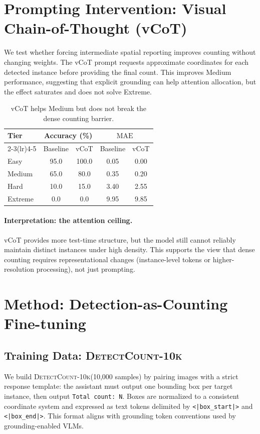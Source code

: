 \documentclass[10pt]{article}
\newcommand{\trainset}{\textsc{DetectCount-10k}\xspace}   %
\newcommand{\mae}{\ensuremath{\mathrm{MAE}}\xspace}
\newcommand{\boxstart}{\texttt{<|box\_start|>}\xspace}
\newcommand{\boxend}{\texttt{<|box\_end|>}\xspace}
\begin{document}
\section{Prompting Intervention: Visual Chain-of-Thought (vCoT)}
We test whether forcing intermediate spatial reporting improves counting without changing weights.
The vCoT prompt requests approximate coordinates for each detected instance before providing the final count.
This improves Medium performance, suggesting that explicit grounding can help attention allocation, but the effect saturates and does not solve Extreme.

\begin{table}[t]
  \centering
  \small
  \setlength{\tabcolsep}{6pt}
  \begin{tabular}{lcccc}
    \toprule
    \multirow{2}{*}{\textbf{Tier}} & \multicolumn{2}{c}{\textbf{Accuracy (\%)}} & \multicolumn{2}{c}{\textbf{\mae}} \\
    \cmidrule(lr){2-3}\cmidrule(lr){4-5}
     & Baseline & vCoT & Baseline & vCoT \\
    \midrule
    Easy     & 95.0 & 100.0 & 0.05 & 0.00 \\
    Medium   & 65.0 & 80.0  & 0.35 & 0.20 \\
    Hard     & 10.0 & 15.0  & 3.40 & 2.55 \\
    Extreme  & 0.0  & 0.0   & 9.95 & 9.85 \\
    \bottomrule
  \end{tabular}
  \caption{vCoT helps Medium but does not break the dense counting barrier.}
  \label{tab:vcot}
\end{table}

\paragraph{Interpretation: the attention ceiling.}
vCoT provides more test-time structure, but the model still cannot reliably maintain distinct instances under high density.
This supports the view that dense counting requires representational changes (instance-level tokens or higher-resolution processing), not just prompting.

\section{Method: Detection-as-Counting Fine-tuning}
\subsection{Training Data: \trainset}
We build \trainset (10,000 samples) by pairing images with a strict response template:
the assistant must output one bounding box per target instance, then output \texttt{Total count: N}.
Boxes are normalized to a consistent coordinate system and expressed as text tokens delimited by \boxstart and \boxend.
This format aligns with grounding token conventions used by grounding-enabled VLMs.
\end{document}
